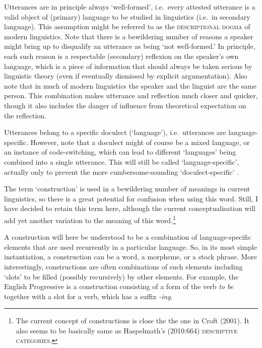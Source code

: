 Utterances are in principle always `well-formed', i.e.~every attested utterance is a valid object of (primary) language to be studied in linguistics (i.e.~in secondary language). This assumption might be referred to as the \textsc{descriptional dogma} of modern linguistics. Note that there is a bewildering number of reasons a speaker might bring up to disqualify an utterance as being `not well-formed.' In principle, each such reason is a respectable (secondary) reflexion on the speaker's own language, which is a piece of information that should always be taken serious by linguistic theory (even if eventually dismissed by explicit argumentation). Also note that in much of modern linguistics the speaker and the linguist are the same person. This combination makes utterance and reflection much closer and quicker, though it also includes the danger of influence from theoretical expectation on the reflection.

Utterances belong to a specific doculect (`language'), i.e.~utterances are language-specific. However, note that a doculect might of course be a mixed language, or an instance of code-switching, which can lead to different `languages' being combined into a single utterance. This will still be called `language-specific', actually only to prevent the more cumbersome-sounding `doculect-specific' .

%
The term `construction' is used in a bewildering number of meanings in current linguistics, so there is a great potential for confusion when using this word. Still, I have decided to retain this term here, although the current conceptualisation will add yet another variation to the meaning of this word.\footnote{The current concept of constructions is close the the one in Croft (2001). It also seems to be basically same as Haspelmath's (2010:664) \textsc{descriptive categories}.}

A construction will here be understood to be a combination of language-specific elements that are used recurrently in a particular language. So, in its most simple instantiation, a construction can be a word, a morpheme, or a stock phrase. More interestingly, constructions are often combinations of such elements including `slots' to be filled (possibly recursively) by other elements. For example, the English Progressive is a construction consisting of a form of the verb \emph{to be} together with a slot for a verb, which has a suffix \emph{-ing}.

